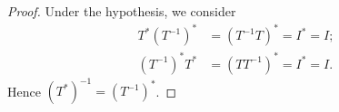 \begin{Exercise}
\begin{proof}
Under the hypothesis, we consider
\begin{align*}
T^* (T^{-1})^* &= (T^{-1} T)^* = I^* = I; \\
(T^{-1})^* T^* &= (T T^{-1})^* = I^* = I.
\end{align*}
Hence $(T^*)^{-1} = (T^{-1})^*$.
\end{proof}
\end{Exercise}